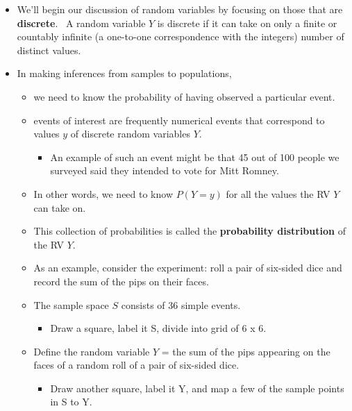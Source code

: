 \documentclass[11pt]{article}
\begin{document}
\begin{itemize}
\item We'll begin our discussion of random variables by focusing on those
that are \textbf{discrete}. \ A random variable $Y$ is discrete if it can
take on only a finite or countably infinite (a one-to-one correspondence
with the integers) number of distinct values.

\item In making inferences from samples to populations,

\begin{itemize}
\item we need to know the probability of having observed a particular event.
\ 

\item events of interest are frequently numerical events that correspond to
values $y$ of discrete random variables $Y$.

\begin{itemize}
\item An example of such an event might be that 45 out of 100 people we
surveyed said they intended to vote for Mitt Romney.
\end{itemize}

\item In other words, we need to know $P(Y=y)$ for all the values the RV $Y$
can take on.

\item This collection of probabilities is called the \textbf{probability
distribution }of the RV $Y$. \ 

\item As an example, consider the experiment: roll a pair of six-sided dice
and record the sum of the pips on their faces.

\item The sample space $S$ consists of 36 simple events. \ 

\begin{itemize}
\item Draw a square, label it S, divide into grid of 6 x 6.
\end{itemize}

\item Define the random variable $Y$ = the sum of the pips appearing on the
faces of a random roll of a pair of six-sided dice.

\begin{itemize}
\item Draw another square, label it Y, and map a few of the sample points in
S to Y.


\end{itemize}
\end{itemize}
\end{itemize}
\end{document}
